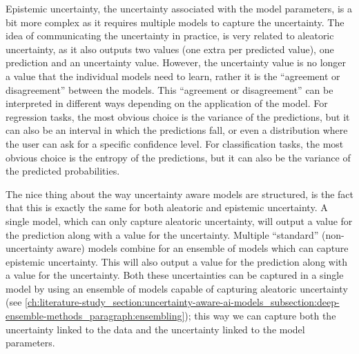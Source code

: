 Epistemic uncertainty, the uncertainty associated with the model parameters, is a bit more complex as it requires multiple models to capture the uncertainty.
The idea of communicating the uncertainty in practice, is very related to aleatoric uncertainty, as it also outputs two values (one extra per predicted value), one prediction and an uncertainty value.
However, the uncertainty value is no longer a value that the individual models need to learn, rather it is the ``agreement or disagreement'' between the models.
This ``agreement or disagreement'' can be interpreted in different ways depending on the application of the model.
For regression tasks, the most obvious choice is the variance of the predictions, but it can also be an interval in which the predictions fall, or even a distribution where the user can ask for a specific confidence level.
For classification tasks, the most obvious choice is the entropy of the predictions, but it can also be the variance of the predicted probabilities.

The nice thing about the way uncertainty aware models are structured, is the fact that this is exactly the same for both aleatoric and epistemic uncertainty.
A single model, which can only capture aleatoric uncertainty, will output a value for the prediction along with a value for the uncertainty.
Multiple ``standard'' (non-uncertainty aware) models combine for an ensemble of models which can capture epistemic uncertainty.
This will also output a value for the prediction along with a value for the uncertainty.
Both these uncertainties can be captured in a single model by using an ensemble of models capable of capturing aleatoric uncertainty (see \cref{ch:literature-study_section:uncertainty-aware-ai-models_subsection:deep-ensemble-methods_paragraph:ensembling}); this way we can capture both the uncertainty linked to the data and the uncertainty linked to the model parameters.

